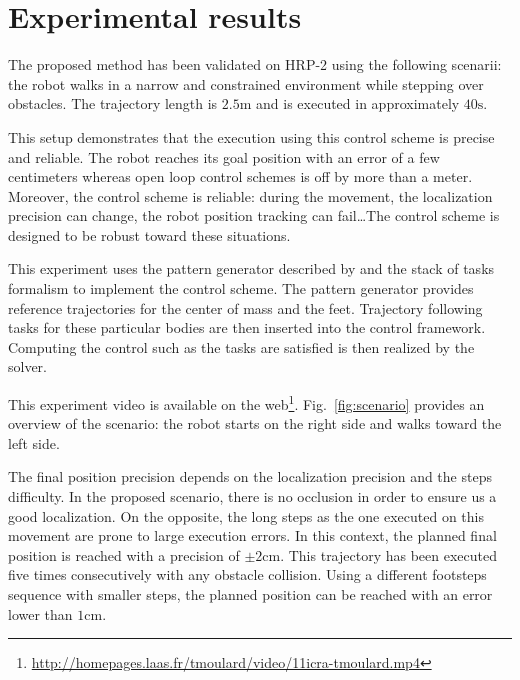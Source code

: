 \section{Experimental results}
\label{exp}


The proposed method has been validated on HRP-2 using the following
scenarii: the robot walks in a narrow and constrained environment
while stepping over obstacles. The trajectory length is
$2.5\mathrm{m}$ and is executed in approximately $40\mathrm{s}$.


This setup demonstrates that the execution using this control scheme
is precise and reliable. The robot reaches its goal position with an
error of a few centimeters whereas open loop control schemes is off by
more than a meter. Moreover, the control scheme is reliable: during
the movement, the localization precision can change, the robot
position tracking can fail\ldots The control scheme is designed to be
robust toward these situations.


This experiment uses the pattern generator described by
\cite{10icra.perrin} and the stack of tasks formalism
\cite{09icar.mansard} to implement the control scheme. The pattern
generator provides reference trajectories for the center of mass and
the feet. Trajectory following tasks for these particular bodies are
then inserted into the control framework. Computing the control such
as the tasks are satisfied is then realized by the solver.


This experiment video is available on the
web\footnote{\mbox{\url{http://homepages.laas.fr/tmoulard/video/11icra-tmoulard.mp4}}}. Fig.~\ref{fig:scenario}
provides an overview of the scenario: the robot starts on the right
side and walks toward the left side.


The final position precision depends on the localization precision and
the steps difficulty. In the proposed scenario, there is no occlusion
in order to ensure us a good localization. On the opposite, the long
steps as the one executed on this movement are prone to large
execution errors. In this context, the planned final position is
reached with a precision of $\pm 2 \mathrm{cm}$. This trajectory has
been executed five times consecutively with any obstacle collision.
Using a different footsteps sequence with smaller steps, the planned
position can be reached with an error lower than $1 \mathrm{cm}$.


